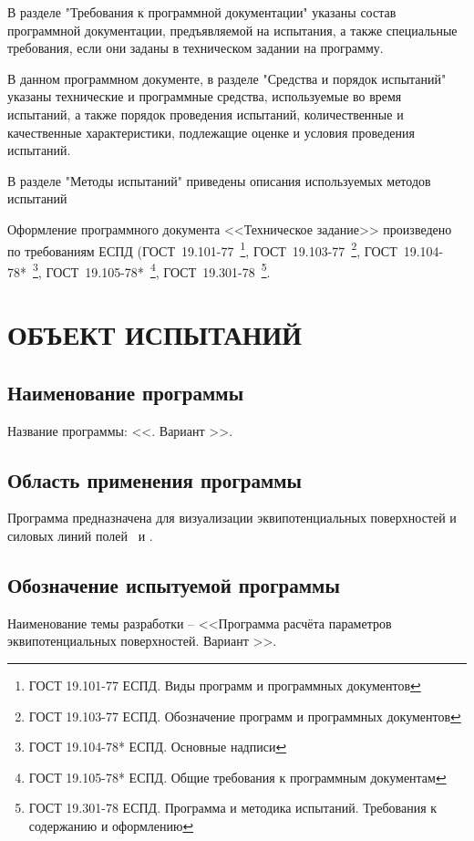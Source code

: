 \documentclass[14pt,a4paper,final]{extreport}
\begin{document}
В разделе "Требования к программной документации" указаны состав
программной документации, предъявляемой на испытания, а также специальные требования, если они заданы в техническом задании на программу.

В данном программном документе, в разделе "Средства и порядок испытаний" указаны технические и программные средства, используемые во время испытаний, а также порядок проведения испытаний, количественные и качественные
характеристики, подлежащие оценке и условия проведения испытаний.

В разделе "Методы испытаний" приведены описания используемых методов
испытаний

Оформление программного документа <<Техническое задание>> произведено по требованиям ЕСПД (ГОСТ~19.101-77~\footnote{ГОСТ 19.101-77 ЕСПД. Виды программ и программных документов}, 
ГОСТ~19.103-77~\footnote{ГОСТ 19.103-77 ЕСПД. Обозначение программ и программных документов}, 
ГОСТ~19.104-78*~\footnote{ГОСТ 19.104-78* ЕСПД. Основные надписи}, 
ГОСТ~19.105-78*~\footnote{ГОСТ 19.105-78* ЕСПД. Общие требования к программным документам},
ГОСТ~19.301-78~\footnote{ГОСТ 19.301-78 ЕСПД. Программа и методика испытаний. Требования к содержанию и оформлению}.

\pagebreak


\tableofcontents

\pagebreak

\chapter{ ОБЪЕКТ ИСПЫТАНИЙ}
\section{Наименование программы}
Название программы: <<\doctitleoneline. Вариант \variant>>.

\section{Область применения программы}
Программа предназначена для визуализации эквипотенциальных поверхностей и силовых линий полей \fieldA\ и \fieldB.

\section{Обозначение испытуемой программы}
Наименование темы разработки -- <<Программа расчёта параметров эквипотенциальных поверхностей. Вариант \variant>>.
\end{document}
